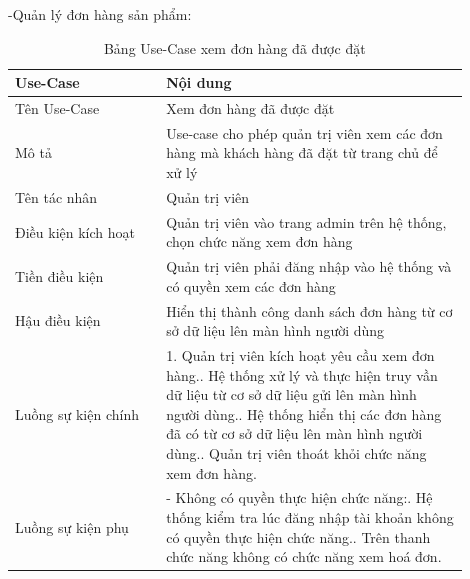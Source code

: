 -Quản lý đơn hàng sản phẩm:
\begin{longtable}[htp]{ |m{0.3\linewidth}|m{0.6\linewidth}|}
 \caption{Bảng Use-Case xem đơn hàng đã được đặt \label{listBill}}\\
 \hline
 Use-Case & Nội dung \\
 \hline
 Tên Use-Case & Xem đơn hàng đã được đặt \\
 \hline
 Mô tả & Use-case cho phép quản trị viên xem các đơn hàng mà khách hàng đã đặt từ trang chủ để xử lý\\
 \hline
 Tên tác nhân & Quản trị viên\\
 \hline
 Điều kiện kích hoạt & Quản trị viên vào trang admin trên hệ thống, chọn chức năng xem đơn hàng\\
 \hline
 Tiền điều kiện & Quản trị viên phải đăng nhập vào hệ thống và có quyền xem các đơn hàng\\
 \hline
 Hậu điều kiện & Hiển thị thành công danh sách đơn hàng từ cơ sở dữ liệu lên màn hình người dùng\\
 \hline
 Luồng sự kiện chính & 
 1. Quản trị viên kích hoạt yêu cầu xem đơn hàng.\newline
 2. Hệ thống xử lý và thực hiện truy vần dữ liệu từ cơ sở dữ liệu gửi lên màn hình người dùng.\newline
 3. Hệ thống hiển thị các đơn hàng đã có từ cơ sở dữ liệu lên màn hình người dùng.\newline	
 4. Quản trị viên thoát khỏi chức năng xem đơn hàng.
 \\
 \hline
 Luồng sự kiện phụ & 
  - Không có quyền thực hiện chức năng:\newline
  1. Hệ thống kiểm tra lúc đăng nhập tài khoản không có quyền thực hiện chức năng.\newline
  2. Trên thanh chức năng không có chức năng xem hoá đơn.
 \\
 \hline
\end{longtable}

